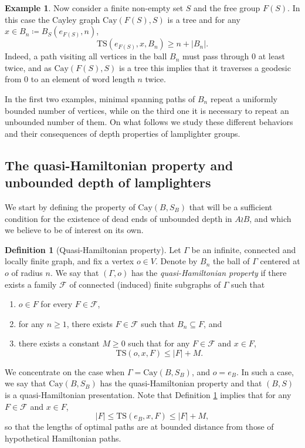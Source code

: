 \documentclass[reqno,oneside]{amsart}
\newcommand{\cay}[2]{\mathrm{Cay}(#1,#2)}
\newcommand{\TS}[3]{\mathrm{TS}\left(#1,#2,#3\right)}
\theoremstyle{plain}
\theoremstyle{definition}
\newtheorem{defn}[thm]{Definition} %
\newtheorem{exmp}[thm]{Example} %
\begin{document}
\begin{exmp}\label{example: qH free group}
	Now consider a finite non-empty set $S$ and the free group $F(S)$. In this case the Cayley graph $\cay{F(S)}{S}$ is a tree and for any $x\in B_n\coloneqq B_S(e_{F(S)},n)$,
	$$
	\TS{e_{F(S)}}{x}{B_n}\ge n+|B_n|.
	$$
	Indeed, a path visiting all vertices in the ball $B_n$ must pass through $0$ at least twice, and as $\cay{F(S)}{S}$ is a tree this implies that it traverses a geodesic from $0$ to an element of word length $n$ twice. 
\end{exmp}

In the first two examples, minimal spanning paths of $B_n$ repeat a uniformly bounded number of vertices, while on the third one it is necessary to repeat an unbounded number of them. On what follows we study these different behaviors and their consequences of depth properties of lamplighter groups.

\subsection{The quasi-Hamiltonian property and unbounded depth of lamplighters}\label{subsection: qH prop and unbounded depth}
We start by defining the property of $\cay{B}{S_B}$ that will be a sufficient condition for the existence of dead ends of unbounded depth in $A\wr B$, and which we believe to be of interest on its own.

\begin{defn}[Quasi-Hamiltonian property]\label{def: qH property} Let $\Gamma$ be an infinite, connected and locally finite graph, and fix a vertex $o\in V$. Denote by $B_n$ the ball of $\Gamma$ centered at $o$ of radius $n$. We say that $(\Gamma,o)$ has the \textit{quasi-Hamiltonian property} if there exists a family $\mathcal{F}$ of connected (induced) finite subgraphs of $\Gamma$ such that
	\begin{enumerate}
		\item $o\in F$ for every $F\in \mathcal{F}$,
		\item for any $n\ge 1$, there exists $F\in \mathcal{F}$ such that $B_n\subseteq F$, and
		\item there exists a constant $M\ge 0$ such that for any $F\in \mathcal{F}$ and $x\in F$,
		$$
		\TS{o}{x}{F}\le  |F|+M.
		$$
	\end{enumerate}
\end{defn}
We concentrate on the case when $\Gamma=\cay{B}{S_B}$, and $o=e_B$. In such a case, we say that $\cay{B}{S_B}$ has the quasi-Hamiltonian property and that $(B,S)$ is a quasi-Hamiltonian presentation.
Note that Definition \ref{def: qH property} implies that for any $F\in \mathcal{F}$ and $x\in F$,
$$
|F|\le\TS{e_B}{x}{F}\le |F|+M,
$$
so that the lengths of optimal paths are at bounded distance from those of hypothetical Hamiltonian paths.
\end{document}
